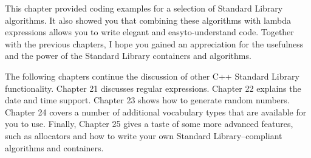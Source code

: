 This chapter provided coding examples for a selection of Standard Library algorithms. It also showed you that combining these algorithms with lambda expressions allows you to write elegant and easyto-understand code. Together with the previous chapters, I hope you gained an appreciation for the usefulness and the power of the Standard Library containers and algorithms.

The following chapters continue the discussion of other C++ Standard Library functionality. Chapter 21 discusses regular expressions. Chapter 22 explains the date and time support. Chapter 23 shows how to generate random numbers. Chapter 24 covers a number of additional vocabulary types that are available for you to use. Finally, Chapter 25 gives a taste of some more advanced features, such as allocators and how to write your own Standard Library–compliant algorithms and containers.
